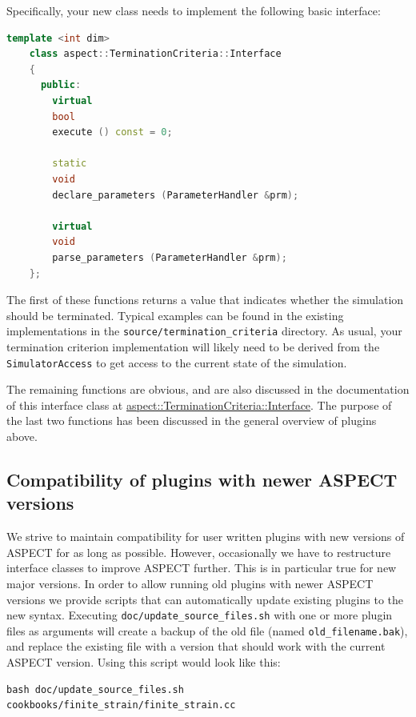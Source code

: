 \documentclass{article}
\newcommand{\aspect}{\textsc{ASPECT}}
\begin{document}
Specifically, your new class needs to implement the following basic interface:
\begin{lstlisting}[frame=single,language=C++]
    template <int dim>
    class aspect::TerminationCriteria::Interface
    {
      public:
        virtual
        bool
        execute () const = 0;

        static
        void
        declare_parameters (ParameterHandler &prm);

        virtual
        void
        parse_parameters (ParameterHandler &prm);
    };
\end{lstlisting}
The first of these functions returns a value that indicates whether the
simulation should be terminated.
Typical examples can be found in the existing implementations in the
\texttt{source/termination\_criteria} directory. As usual, your termination
criterion implementation will likely need to be derived from the
\texttt{SimulatorAccess} to get access to the current state of the simulation.

The remaining functions are
obvious, and are also discussed in the documentation of this interface class at
\href{doc/doxygen/classaspect_1_1TerminationCriteria_1_1Interface.html}{aspect::TerminationCriteria::Interface}.
The purpose
of the last two functions has been discussed in the general overview of
plugins above.


\subsection{Compatibility of plugins with newer \aspect{} versions}

We strive to maintain compatibility for user written plugins with new versions
of \aspect{} for as long as possible. However, occasionally we have to
restructure interface classes to improve \aspect{} further. This is in
particular true for new major versions. In order to allow running old plugins
with newer \aspect{} versions we provide scripts that can automatically update
existing plugins to the new syntax. Executing
\texttt{doc/update\_source\_files.sh} with one or more plugin files as
arguments will create a backup of the old file (named
\texttt{old\_filename.bak}), and replace the existing file with a version that
should work with the current \aspect{} version. Using this script would look
like this:

\begin{lstlisting}[frame=single,language=ksh,showstringspaces=false]
bash doc/update_source_files.sh cookbooks/finite_strain/finite_strain.cc
\end{lstlisting}
\end{document}
